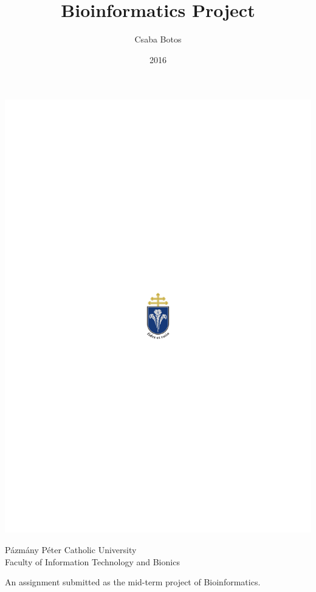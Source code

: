 \documentclass[10pt]{report}
\author{Csaba Botos}
\title{Bioinformatics Project}
\date{2016}
\begin{document}

\includegraphics[valign=m]{ITK_logo} \parbox[c]{\textwidth}{Pázmány Péter Catholic University\\ Faculty of Information Technology and Bionics}
\vspace*{\fill}

{\let\newpage\relax\maketitle}
\vspace*{\fill}
\begin{center}
An assignment submitted as the mid-term project of Bioinformatics.

\end{center}
\clearpage


\clearpage

\clearpage
\tableofcontents
\clearpage


\clearpage

\clearpage

\clearpage

\clearpage

\clearpage
%
%

\clearpage
\clearpage

\listoffigures
{}
\clearpage
\printbibliography
\clearpage
\end{document}
